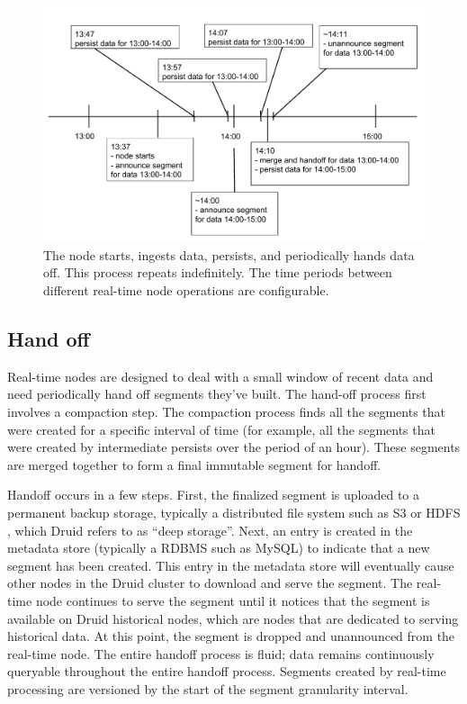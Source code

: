 \documentclass{vldb}
\begin{document}
\begin{figure}
\centering
\includegraphics[width = 4.5in]{realtime_timeline}
\caption{The node starts, ingests data, persists, and periodically hands data
off. This process repeats indefinitely. The time periods between different
real-time node operations are configurable.}
\label{fig:realtime_timeline}
\end{figure}

\subsection{Hand off}
Real-time nodes are designed to deal with a small window of recent data and
need periodically hand off segments they’ve built. The hand-off process first
involves a compaction step. The compaction process finds all the segments that
were created for a specific interval of time (for example, all the segments
that were created by intermediate persists over the period of an hour). These
segments are merged together to form a final immutable segment for handoff. 

Handoff occurs in a few steps. First, the finalized segment is uploaded to a
permanent backup storage, typically a distributed file system such as S3
\cite{decandia2007dynamo} or HDFS \cite{shvachko2010hadoop}, which Druid refers
to as “deep storage”. Next, an entry is created in the metadata store
(typically a RDBMS such as MySQL) to indicate that a new segment has been
created. This entry in the metadata store will eventually cause other nodes in
the Druid cluster to download and serve the segment. The real-time node
continues to serve the segment until it notices that the segment is available
on Druid historical nodes, which are nodes that are dedicated to serving
historical data. At this point, the segment is dropped and unannounced from the
real-time node. The entire handoff process is fluid; data remains continuously
queryable throughout the entire handoff process. Segments created by real-time
processing are versioned by the start of the segment granularity interval.
\end{document}

